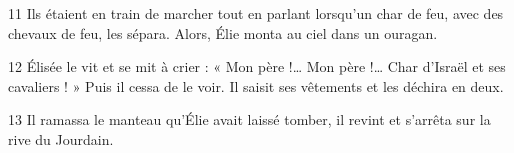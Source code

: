 
11 Ils étaient en train de marcher tout en parlant lorsqu’un char de feu, avec des chevaux de feu, les sépara. Alors, Élie monta au ciel dans un ouragan.

12 Élisée le vit et se mit à crier : « Mon père !… Mon père !… Char d’Israël et ses cavaliers ! » Puis il cessa de le voir. Il saisit ses vêtements et les déchira en deux.

13 Il ramassa le manteau qu’Élie avait laissé tomber, il revint et s’arrêta sur la rive du Jourdain.